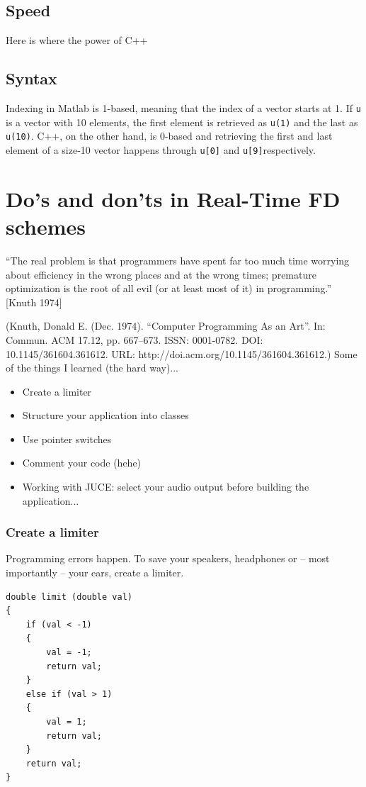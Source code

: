 \subsection{Speed}
Here is where the power of C++ 



\subsection{Syntax}
Indexing in
Matlab is 1-based, meaning that the index of a vector starts at 1. If \texttt{u} is a vector with 10 elements, the first element is retrieved as \texttt{u(1)} and the last as \texttt{u(10)}. C++, on the other hand, is 0-based and retrieving the first and last element of a size-10 vector happens through \texttt{u[0]} and \texttt{u[9]}respectively. 

\section{Do's and don'ts in Real-Time FD schemes}

“The real problem is that programmers have spent far too much time worrying about efficiency in the wrong places and at the wrong times; premature optimization is the root of all evil (or at least most of it) in programming.” [Knuth 1974]

(Knuth, Donald E. (Dec. 1974). “Computer Programming As an Art”. In: Commun. ACM 17.12, pp. 667–673. ISSN: 0001-0782. DOI: 10.1145/361604.361612. URL: http://doi.acm.org/10.1145/361604.361612.)
Some of the things I learned (the hard way)...
\begin{itemize}
    \item Create a limiter
    \item Structure your application into classes 
    \item Use pointer switches
    \item Comment your code (hehe)
    \item Working with JUCE: select your audio output before building the application...
\end{itemize}

\subsubsection{Create a limiter}
Programming errors happen. To save your speakers, headphones or -- most importantly -- your ears, create a limiter. 

\setlstCpp
\begin{lstlisting}
double limit (double val)
{
    if (val < -1)
    {
        val = -1;
        return val;
    }
    else if (val > 1)
    {
        val = 1;
        return val;
    }
    return val;
}
\end{lstlisting}

